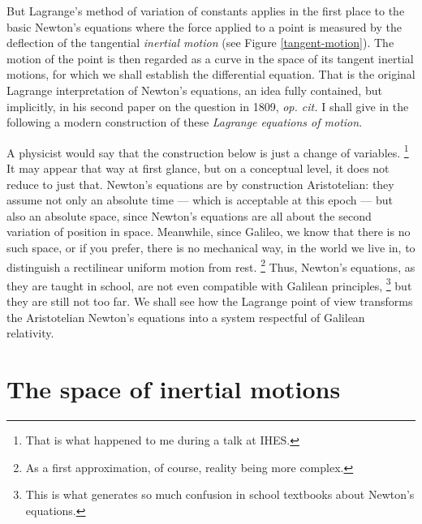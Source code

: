 But Lagrange's method of variation of constants applies
in the first place to the basic Newton's equations where the force
applied to a point is measured by the
deflection of the tangential {\em inertial motion} (see Figure \ref{tangent-motion}).
The motion of the point is then regarded as a
curve in the space of its tangent inertial motions,
for which we shall establish the
differential equation.
That is the original Lagrange interpretation of Newton's equations,
an idea fully contained, but implicitly, in his second paper on the question
in 1809, {\em op. cit.}
I shall give in the following a modern construction of these {\em Lagrange equations of motion}.

\Note A physicist would say that the construction below is
just a change of variables.%
\footnote{That is what happened to me during a talk at IHES.}
It may appear that way at first glance, but on a conceptual level,
it does not reduce to just that.
Newton's equations are by construction Aristotelian:
they assume not only an absolute time --- which is acceptable at this
epoch --- but also an absolute space, since Newton's equations are all
about the second variation of
position in space. Meanwhile, since Galileo, we know that there is
no such space, or if you prefer,
there is no mechanical way, in the world we live in, to distinguish a
rectilinear uniform motion from rest.%
\footnote{As a first approximation,
of course, reality being more complex.}
Thus, Newton's equations, as they are taught in school,
are not even compatible with Galilean principles,%
\footnote{This is what
generates so much confusion in school textbooks about Newton's equations.}
but they are still not too far.
We shall see how the Lagrange point of view
transforms the Aristotelian Newton's equations into a system respectful
of Galilean relativity.

\section{The space of inertial motions}

